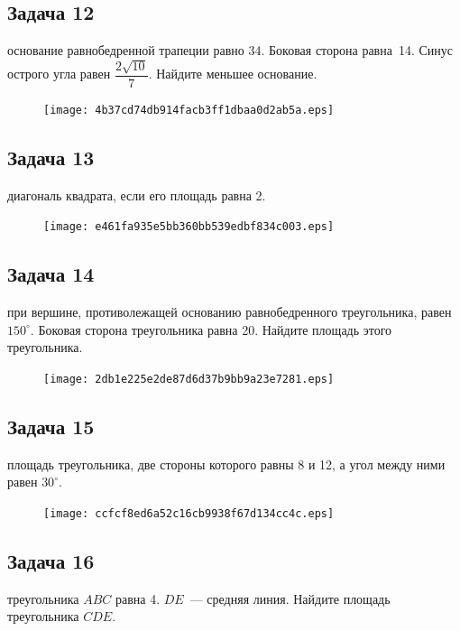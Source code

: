 \documentclass[a4paper,10pt]{article} %
\begin{document}
\begin{spacing}{1.0}
{\subsection*{Задача 12}
 основание равнобедренной трапеции равно 34. Боковая сторона равна~14. Синус острого угла равен $\dfrac{2\sqrt{10}}{7}$. Найдите меньшее основание.

\vspace{1.5cm}

\begin{figure}{\texttt{[image: 4b37cd74db914facb3ff1dbaa0d2ab5a.eps]}}\end{figure}
\subsection*{Задача 13}
 диагональ квадрата, если его площадь равна 2.

\vspace{1.5cm}

\begin{figure}{\texttt{[image: e461fa935e5bb360bb539edbf834c003.eps]}}\end{figure}
\subsection*{Задача 14}
 при вершине, противолежащей основанию равнобедренного треугольника, равен $150^\circ$. Боковая сторона треугольника равна 20. Найдите площадь этого треугольника. 

\vspace{1.5cm}

\begin{figure}{\texttt{[image: 2db1e225e2de87d6d37b9bb9a23e7281.eps]}}\end{figure}
\subsection*{Задача 15}
 площадь треугольника, две стороны которого равны 8 и 12, а угол между ними равен $30^\circ$. 

\vspace{1.5cm}

\begin{figure}{\texttt{[image: ccfcf8ed6a52c16cb9938f67d134cc4c.eps]}}\end{figure}
\subsection*{Задача 16}
 треугольника $ABC$ равна 4. $DE$~--- средняя линия. Найдите площадь треугольника $CDE$.

}
\end{spacing}
\end{document}
